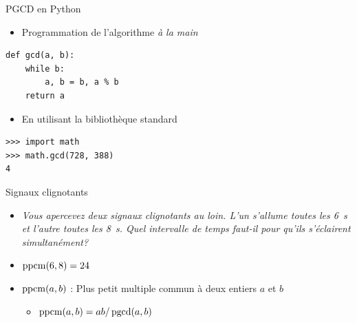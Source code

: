 \documentclass{main}
\begin{document}
\begin{frame}[fragile]{PGCD en Python}
    \begin{itemize}
        \item Programmation de l’algorithme \emph{à la main}
    \end{itemize}
    \begin{verbatim}
def gcd(a, b):
    while b:
        a, b = b, a % b
    return a
    \end{verbatim}
    \begin{itemize}
        \item En utilisant la bibliothèque standard
    \end{itemize}
    \begin{verbatim}
>>> import math
>>> math.gcd(728, 388)
4
    \end{verbatim}
\end{frame}

\begin{frame}{Signaux clignotants}
    \begin{itemize}
        \item \emph{Vous apercevez deux signaux clignotants au loin. L’un s’allume toutes les 6~s et l’autre toutes les 8~s. Quel intervalle de temps faut-il pour qu’ils s’éclairent simultanément?}
    \end{itemize}
    
    \pause
    {\centering
    
    }
    
    \begin{itemize}
        \item $\operatorname{ppcm}(6, 8) = 24$
        \item $\operatorname{ppcm}(a, b)$ : Plus petit multiple commun à deux entiers $a$ et $b$
        \begin{itemize}
            \item $\operatorname{ppcm}(a, b) = ab / \operatorname{pgcd}(a, b)$
        \end{itemize}
    \end{itemize}
\end{frame}
\end{document}
